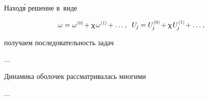 \begin{otherlanguage}{russian}
\vspace{-0.5em}\noindent
Наход\'{я} решение в~виде

\nopagebreak\vspace{-0.2em}\begin{equation*}
\omega = \omega^{\hspace{.1ex}\scalebox{.66}{(0)}} \hspace{-0.25ex} + \smallparameter \hspace{.2ex} \omega^{\hspace{.1ex}\scalebox{.66}{(1)}} \hspace{-0.25ex} + \ldots \hspace{.1ex} ,
\;\;
U_{\hspace{-0.2ex}j} \hspace{-0.15ex} = U_{\hspace{-0.2ex}j}^{\hspace{.1ex}\scalebox{.66}{(0)}} \hspace{-0.25ex} + \smallparameter \hspace{.2ex} U_{\hspace{-0.2ex}j}^{\hspace{.1ex}\scalebox{.66}{(1)}} \hspace{-0.25ex} + \ldots \hspace{.1ex} ,
\end{equation*}

\vspace{-0.25em}\noindent
получаем последовательность задач

...




\end{otherlanguage}



\label{section:vibrations.shells}

\begin{otherlanguage}{russian}

Динамика оболочек рассматривалась многими

...




\end{otherlanguage}

